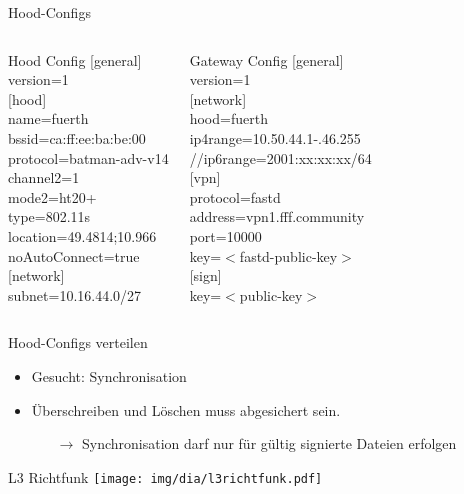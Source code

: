 \begin{frame}{Hood-Configs}
    \begin{columns}
        \begin{block}{Hood Config}
            \footnotesize
            [general]\\
            version=1\\[1ex]
            [hood]\\
            name=fuerth\\
            bssid=ca:ff:ee:ba:be:00\\
            protocol=batman-adv-v14\\
            channel2=1\\
            mode2=ht20+\\
            type=802.11s\\
            location=49.4814;10.966\\
            noAutoConnect=true\\[1ex]
            [network]\\
            subnet=10.16.44.0/27
        \end{block}
        \begin{block}{Gateway Config}
            \footnotesize
            [general]\\
            version=1\\[1ex]
            [network]\\
            hood=fuerth\\
            ip4range=10.50.44.1-.46.255\\
            //ip6range=2001:xx:xx:xx/64\\[1ex]
            [vpn]\\
            protocol=fastd\\
            address=vpn1.fff.community\\
            port=10000\\
            key=$<$fastd-public-key$>$\\[1ex]
            [sign]\\
            key=$<$public-key$>$\\
        \end{block}
    \end{columns}
\end{frame}

\begin{frame}{Hood-Configs verteilen}
    \begin{itemize}
        \item Gesucht: Synchronisation
        \item Überschreiben und Löschen muss abgesichert sein.
        \begin{itemize}
            \item[$\rightarrow$] Synchronisation darf nur für gültig signierte Dateien erfolgen
        \end{itemize}
    \end{itemize}
\end{frame}

\begin{frame}{L3 Richtfunk}
    \center
    \texttt{[image: img/dia/l3richtfunk.pdf]}
\end{frame}


